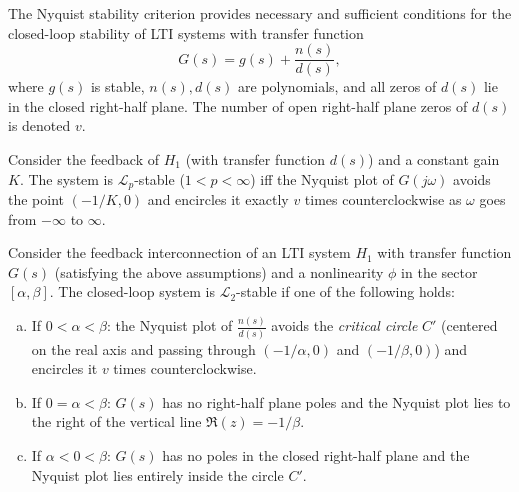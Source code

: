The Nyquist stability criterion provides necessary and sufficient conditions for the closed-loop stability of LTI systems with transfer function
\[
    G(s) = g(s) + \frac{n(s)}{d(s)},
\]
where $g(s)$ is stable, $n(s),d(s)$ are polynomials, and all zeros of $d(s)$ lie in the closed right-half plane. The number of open right-half plane zeros of $d(s)$ is denoted $v$.  

\begin{proposition}
Consider the feedback of $H_1$ (with transfer function $d(s)$) and a constant gain $K$. The system is $\mathcal{L}_p$-stable ($1<p<\infty$) iff the Nyquist plot of $G(j\omega)$ avoids the point $(-1/K,0)$ and encircles it exactly $v$ times counterclockwise as $\omega$ goes from $-\infty$ to $\infty$.
\end{proposition}

\begin{theorem}
Consider the feedback interconnection of an LTI system $H_1$ with transfer function $G(s)$ (satisfying the above assumptions) and a nonlinearity $\phi$ in the sector $[\alpha,\beta]$. The closed-loop system is $\mathcal{L}_2$-stable if one of the following holds:
\begin{enumerate}[(a)]
    \item If $0 < \alpha < \beta$: the Nyquist plot of $\tfrac{n(s)}{d(s)}$ avoids the \emph{critical circle} $C'$ (centered on the real axis and passing through $(-1/\alpha,0)$ and $(-1/\beta,0)$) and encircles it $v$ times counterclockwise.
    \item If $0=\alpha<\beta$: $G(s)$ has no right-half plane poles and the Nyquist plot lies to the right of the vertical line $\Re(z) = -1/\beta$.
    \item If $\alpha<0<\beta$: $G(s)$ has no poles in the closed right-half plane and the Nyquist plot lies entirely inside the circle $C'$.
\end{enumerate}
\end{theorem}

